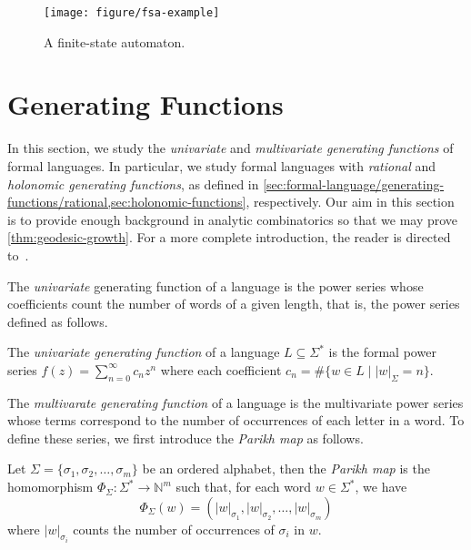\begin{figure}[h!t]
	\centering
	\texttt{[image: figure/fsa-example]}
	\caption{A finite-state automaton.}\label{fig:example-fsa}
\end{figure}

\section{Generating Functions}%
\label{sec:generating-functions}

In this section, we study the \emph{univariate} and \emph{multivariate generating functions} of formal languages.
In particular, we study formal languages with \emph{rational} and \emph{holonomic  generating functions}, as defined in \cref{sec:formal-language/generating-functions/rational,sec:holonomic-functions}, respectively.
Our aim in this section is to provide enough background in analytic combinatorics so that we may prove \cref{thm:geodesic-growth}.
For a more complete introduction, the reader is directed to~\cite{flajolet2009}.

The \emph{univariate} generating function of a language is the power series whose coefficients count the number of words of a given length, that is, the power series defined as follows.

\begin{definition}\label{defn:univariate-generating-function}
	The \emph{univariate generating function} of a language $L \subseteq \Sigma^*$ is the formal power series $f(z) = \sum_{n=0}^\infty c_n z^n$ where each coefficient $c_n = \#\{w \in L \mid |w|_\Sigma = n\}$.
\end{definition}

The \emph{multivarate generating function} of a language is the multivariate power series whose terms correspond to the number of occurrences of each letter in a word.
To define these series, we first introduce the \emph{Parikh map} as follows.

\begin{definition}\label{defn:parikh-image}
	Let $\Sigma = \{\sigma_1, \sigma_2, \ldots, \sigma_m\}$ be an ordered alphabet, then the \emph{Parikh map} is the homomorphism $\Phi_\Sigma\colon \Sigma^* \to \mathbb{N}^m$ such that, for each word $w \in \Sigma^*$, we have
	\[
		\Phi_\Sigma(w) = (|w|_{\sigma_1},|w|_{\sigma_2},\ldots,|w|_{\sigma_m})
	\]
	where $|w|_{\sigma_i}$ counts the number of occurrences of $\sigma_i$ in $w$.
\end{definition}

